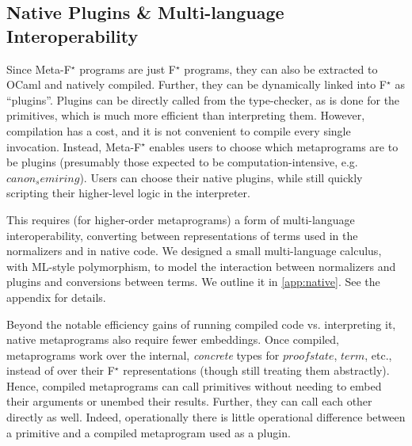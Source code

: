 \documentclass[runningheads]{llncs}
\newcommand\fstar{F$^\star$\xspace}
\newcommand\metafstar{Meta-F$^\star$\xspace}
\newcommand{\comm}[3]{\ifcheckpagebudget\else\ifdraft{{\color{#1}[#2: #3]}}\fi\fi}
\newcommand{\ch}[1]{\comm{teal}{CH}{#1}}
\newcommand{\guido}[1]{\comm{blue}{Guido}{#1}}
\begin{document}
\subsection{Native Plugins \& Multi-language Interoperability}


Since \metafstar programs are just \fstar programs, they can also be
extracted to OCaml and natively compiled.
%
Further, they can be dynamically linked into \fstar as ``plugins''.
%
Plugins can be directly called from the type-checker, as is done for the
primitives, which is much more efficient than interpreting them.
%
%
However, compilation has a cost, and it is not convenient to compile
every single invocation.
%
Instead, \metafstar enables users to choose which metaprograms
are to be plugins
(presumably those expected to be computation-intensive, e.g.
\ls$canon_semiring$).
%
Users can choose their native plugins, while still quickly
scripting their higher-level logic in the interpreter.

This requires (for higher-order metaprograms) a form of multi-language
interoperability, converting between representations of terms used in
the normalizers and in native code.
%
%
We designed a small multi-language calculus, with ML-style polymorphism,
to model the interaction between normalizers and plugins and
conversions between terms.
%
\iffull
We outline it in
\autoref{app:native}.
\else
See the appendix for details.
\fi


Beyond the notable efficiency gains of running compiled code vs.
interpreting it, native metaprograms also require fewer embeddings.
%
Once compiled, metaprograms work over the internal, \emph{concrete}
types for \ls$proofstate$, \ls$term$, etc., instead of over their
\fstar representations (though still treating them abstractly).
%
Hence, compiled metaprograms can call primitives without needing to
embed their arguments or unembed their results.
%
Further, they can call each other directly as well.
%
Indeed, operationally there is little operational difference
between a primitive and a compiled metaprogram used as a plugin.
\end{document}
